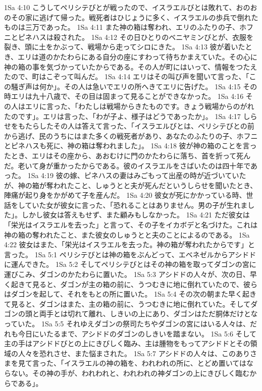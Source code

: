 1Sa 4:10  こうしてペリシテびとが戦ったので、イスラエルびとは敗れて、おのおのその家に逃げて帰った。戦死者はひじょうに多く、イスラエルの歩兵で倒れたものは三万であった。
1Sa 4:11  また神の箱は奪われ、エリのふたりの子、ホフニとピネハスは殺された。
1Sa 4:12  その日ひとりのベニヤミンびとが、衣服を裂き、頭に土をかぶって、戦場から走ってシロにきた。
1Sa 4:13  彼が着いたとき、エリは道のかたわらにある自分の座にすわって待ちかまえていた。その心に神の箱の事を気づかっていたからである。その人が町にはいって、情報をつたえたので、町はこぞって叫んだ。
1Sa 4:14  エリはその叫び声を聞いて言った、「この騒ぎ声は何か」。その人は急いでエリの所へきてエリに告げた。
1Sa 4:15  その時エリは九十八歳で、その目は固まって見ることができなかった。
1Sa 4:16  その人はエリに言った、「わたしは戦場からきたものです。きょう戦場からのがれたのです」。エリは言った、「わが子よ、様子はどうであったか」。
1Sa 4:17  しらせをもたらしたその人は答えて言った、「イスラエルびとは、ペリシテびとの前から逃げ、民のうちにはまた多くの戦死者があり、あなたのふたりの子、ホフニとピネハスも死に、神の箱は奪われました」。
1Sa 4:18  彼が神の箱のことを言ったとき、エリはその座から、あおむけに門のかたわらに落ち、首を折って死んだ。老いて身が重かったからである。彼のイスラエルをさばいたのは四十年であった。
1Sa 4:19  彼の嫁、ピネハスの妻はみごもって出産の時が近づいていたが、神の箱が奪われたこと、しゅうとと夫が死んだというしらせを聞いたとき、陣痛が起り身をかがめて子を産んだ。
1Sa 4:20  彼女が死にかかっている時、世話をしていた女が彼女に言った、「恐れることはありません。男の子が生れました」。しかし彼女は答えもせず、また顧みもしなかった。
1Sa 4:21  ただ彼女は「栄光はイスラエルを去った」と言って、その子をイカボデと名づけた。これは神の箱の奪われたこと、また彼女のしゅうとと夫のことによるのである。
1Sa 4:22  彼女はまた、「栄光はイスラエルを去った。神の箱が奪われたからです」と言った。
1Sa 5:1  ペリシテびとは神の箱をぶんどって、エベネゼルからアシドドに運んできた。
1Sa 5:2  そしてペリシテびとはその神の箱を取ってダゴンの宮に運びこみ、ダゴンのかたわらに置いた。
1Sa 5:3  アシドドの人々が、次の日、早く起きて見ると、ダゴンが主の箱の前に、うつむきに地に倒れていたので、彼らはダゴンを起して、それをもとの所に置いた。
1Sa 5:4  その次の朝また早く起きて見ると、ダゴンはまた、主の箱の前に、うつむきに地に倒れていた。そしてダゴンの頭と両手とは切れて離れ、しきいの上にあり、ダゴンはただ胴体だけとなっていた。
1Sa 5:5  それゆえダゴンの祭司たちやダゴンの宮にはいる人々は、だれも今日にいたるまで、アシドドのダゴンのしきいを踏まない。
1Sa 5:6  そして主の手はアシドドびとの上にきびしく臨み、主は腫物をもってアシドドとその領域の人々を恐れさせ、また悩まされた。
1Sa 5:7  アシドドの人々は、このありさまを見て言った、「イスラエルの神の箱を、われわれの所に、とどめ置いてはならない。その神の手が、われわれと、われわれの神ダゴンの上にきびしく臨むからである」。
